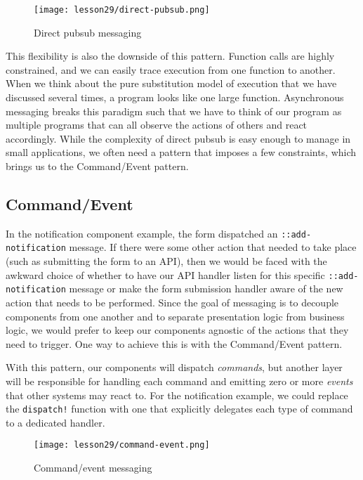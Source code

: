 \documentclass[10pt,twoside,openright]{memoir}
\begin{document}
\begin{figure}[H]
\caption{Direct pubsub messaging}
\centering
\texttt{[image: lesson29/direct-pubsub.png]}
\end{figure}

This flexibility is also the downside of this pattern. Function calls
are highly constrained, and we can easily trace execution from one
function to another. When we think about the pure substitution model of
execution that we have discussed several times, a program looks like one
large function. Asynchronous messaging breaks this paradigm such that we
have to think of our program as multiple programs that can all observe
the actions of others and react accordingly. While the complexity of
direct pubsub is easy enough to manage in small applications, we often
need a pattern that imposes a few constraints, which brings us to the
Command/Event pattern.


\subsection{Command/Event}

In the notification component example, the form dispatched an
\texttt{::add-notification} message. If there were some other action
that needed to take place (such as submitting the form to an API), then
we would be faced with the awkward choice of whether to have our API
handler listen for this specific \texttt{::add-notification} message or
make the form submission handler aware of the new action that needs to
be performed. Since the goal of messaging is to decouple components from
one another and to separate presentation logic from business logic, we
would prefer to keep our components agnostic of the actions that they
need to trigger. One way to achieve this is with the Command/Event
pattern.

With this pattern, our components will dispatch \emph{commands}, but
another layer will be responsible for handling each command and emitting
zero or more \emph{events} that other systems may react to. For the
notification example, we could replace the \texttt{dispatch!} function
with one that explicitly delegates each type of command to a dedicated
handler.

\begin{figure}[H]
\caption{Command/event messaging}
\centering
\texttt{[image: lesson29/command-event.png]}
\end{figure}
\end{document}
